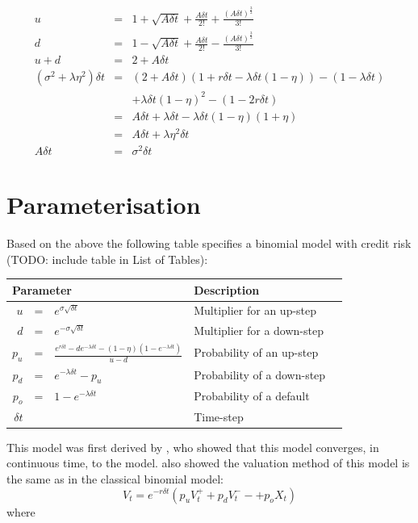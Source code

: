 \documentclass[a4paper,11pt,oneside]{report}
\theoremstyle{plain}
\theoremstyle{definition}
\def\Dt{\ensuremath{\delta t}\xspace}
\def\u{\ensuremath{u}\xspace}
\def\d{\ensuremath{d}\xspace}
\def\o{\ensuremath{o}\xspace}
\def\pu{\ensuremath{p_\u}\xspace}
\def\pd{\ensuremath{p_\d}\xspace}
\def\po{\ensuremath{p_\o}\xspace}
\begin{document}
\begin{displaymath}\begin{array}{rcl}
 \u                     &=& 1 + \sqrt{A\Dt} + \frac{A\Dt}{2!} + \frac{(A\Dt)^{\frac{3}{2}}}{3!} \\
 \d                     &=& 1 - \sqrt{A\Dt} + \frac{A\Dt}{2!} - \frac{(A\Dt)^{\frac{3}{2}}}{3!} \\
 \u + \d                &=& 2 + A\Dt \\
 (\sigma^2 + \lambda\eta^2)\Dt &=& (2 + A\Dt)(1 + r\Dt - \lambda\Dt(1 - \eta)) - (1 - \lambda\Dt) \\
                        & & + \lambda\Dt(1 - \eta)^2 - (1 - 2r\Dt) \\
                        &=& A\Dt + \lambda\Dt - \lambda\Dt(1 - \eta)(1 + \eta) \\
                        &=& A\Dt + \lambda\eta^2\Dt \\
 A\Dt                  &=& \sigma^2\Dt
\end{array}\end{displaymath}

\section{Parameterisation}
Based on the above the following table specifies a binomial model with credit risk (TODO: include table in List of Tables):

\begin{center}\begin{tabular}{|rcl|l|l|}\hline
 \multicolumn{3}{|l|}{\textbf{Parameter}} & \textbf{Description} \\\hline
 \u     &=& $e^{\sigma\sqrt{\Dt}}$ &
    Multiplier for an up-step \\\hline
 \d     &=& $e^{-\sigma\sqrt{\Dt}}$ &
    Multiplier for a down-step \\\hline
 \pu    &=& $\frac{e^{r\Dt} - \d e^{-\lambda\Dt} - (1 - \eta)(1 - e^{-\lambda\Dt})}{\u - \d}$ &
    Probability of an up-step \\\hline
 \pd    &=& $e^{-\lambda\Dt} - \pu$ &
    Probability of a down-step \\\hline
 \po    &=& $1 - e^{-\lambda\Dt}$ &
    Probability of a default \\\hline
 \Dt    & & &
    Time-step \\ \hline
\end{tabular}\end{center}

This model was first derived by \citet{MK12}, who showed that this model converges, in continuous time, to the \citet{AFV03} model.   also showed the valuation method of this model is the same as in the classical binomial model:
\begin{displaymath}
 V_t = e^{-r\Dt}(\pu V^{+}_t + \pd V^{-}_t- + \po X_t)
\end{displaymath}
where
\end{document}
